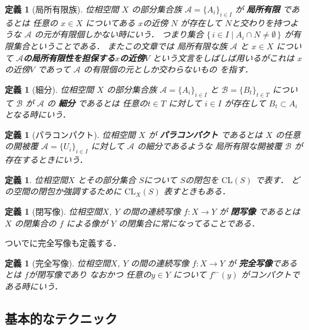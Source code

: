 \documentclass[leqno, a4paper, 12pt]{jsarticle}
\newtheorem{df}[thm]{定義}
\newcommand{\cl}{\mathrm{CL}}
\newcommand{\myinv}[1]{#1^{\gets}}
\begin{document}
\begin{df}[局所有限族]
位相空間
$X$
の部分集合族
$\mathcal{A}=\{A_{i}\}_{i\in I}$
が
\textbf{局所有限}
であるとは
任意の
$x\in X$
についてある
$x$の近傍
$N$
が存在して
$N$と交わりを持つような
$\mathcal{A}$
の元が有限個しかない時にいう．
つまり集合
$\{\, i\in I\mid A_{i}\cap N\neq \emptyset\, \}$
が有限集合ということである．
またこの文章では
局所有限な族
$\mathcal{A}$
と
$x\in X$
について
\textbf{$\mathcal{A}$の局所有限性を担保する$x$の近傍$V$}
という文言をしばしば用いるがこれは
$x$の近傍$V$
であって
$\mathcal{A}$
の有限個の元としか交わらないもの
を指す．
\end{df}

\begin{df}[細分]
位相空間
$X$
の部分集合族
$\mathcal{A}=\{A_{i}\}_{i\in I}$
と
$\mathcal{B}=\{B_{t}\}_{t\in T}$
について
$\mathcal{B}$
が
$\mathcal{A}$
の
\textbf{細分}
であるとは
任意の$t\in T$
に対して
$i\in I$
が存在して
$B_{t}\subset A_{i}$
となる時にいう．
\end{df}

\begin{df}[パラコンパクト]
位相空間
$X$
が
\textbf{パラコンパクト}
であるとは
$X$
の任意の開被覆
$\mathcal{A}=\{U_{i}\}_{i\in I}$
に対して
$\mathcal{A}$
の細分であるような
局所有限な開被覆
$\mathcal{B}$
が存在するときにいう．
\end{df}

\begin{df}
位相空間$X$
とその部分集合
$S$について
$S$の閉包を
$\cl(S)$
で表す．
どの空間の閉包か強調するために
$\cl_{X}(S)$
表すときもある．
\end{df}


\begin{df}[閉写像] 
位相空間$X$, $Y$
の間の連続写像
$f:X\to  Y$
が
\textbf{閉写像}
であるとは
$X$
の閉集合の
$f$
による像が
$Y$
の閉集合に常になってることである．
\end{df}

ついでに完全写像も定義する．
\begin{df}[完全写像]
位相空間$X$, $Y$
の間の連続写像
$f:X\to  Y$
が
\textbf{完全写像}であるとは
$f$が閉写像であり
なおかつ
任意の$y\in Y$
について
$\myinv{f}(y)$
がコンパクトである時にいう．
\end{df} 



\subsection{基本的なテクニック}
\end{document}
